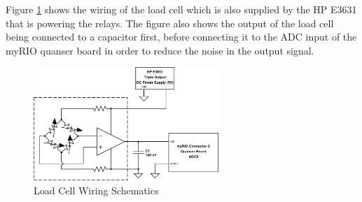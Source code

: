 \begin{enumerate}
    Figure \ref{LCWS} shows the wiring of the load cell which is also supplied by the HP E3631 that is powering the relays. The figure also shows the output of the load cell being connected to a capacitor first, before connecting it to the ADC input of the myRIO quanser board in order to reduce the noise in the output signal.
    \begin{figure}[H]
    \begin{center}
    \includegraphics[width=2.75in]{Images/load_cell_wiring.png}
    \caption{Load Cell Wiring Schematics}
    \label{LCWS}
    \end{center}
    \end{figure}
\end{enumerate}
